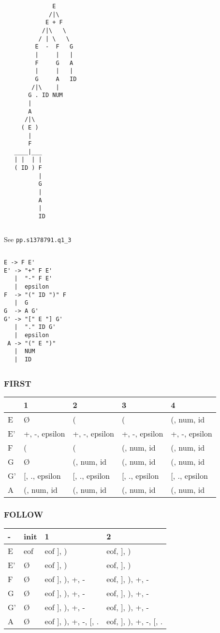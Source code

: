 \begin{verbatim}
              E
             /|\
            E + F
           /|\   \
          / | \   \
         E  -  F   G
         |     |   |
         F     G   A
         |     |   |
         G     A   ID
        /|\    |
       G . ID NUM
       |
       A
      /|\
     ( E )
       |
       F
   ____|___
   | |  | |
   ( ID ) F
          |
          G
          |
          A
          |
          ID
\end{verbatim}

\subsection{}
See \texttt{pp.s1378791.q1\_3}

\subsection{}
\begin{verbatim}
E -> F E'
E' -> "+" F E'
   |  "-" F E'
   |  epsilon
F  -> "(" ID ")" F
   |  G
G  -> A G'
G' -> "[" E "] G'
   |  "." ID G'
   |  epsilon
 A -> "(" E ")"
   |  NUM
   |  ID
\end{verbatim}

\subsection{}
\subsubsection{FIRST}
\begin{tabular}{lllll}
& 1 & 2 & 3 & 4 \\
\hline
E & Ø & ( & ( & (, num, id \\
E'& +, -, epsilon & +, -, epsilon & +, -, epsilon & +, -, epsilon \\
F & ( & ( & (, num, id & (, num, id \\
G & Ø & (, num, id & (, num, id &  (, num, id \\
G'& [, ., epsilon & [, ., epsilon & [, ., epsilon & [, ., epsilon \\
A & (, num, id & (, num, id & (, num, id & (, num, id \\
\end{tabular}

\subsubsection{FOLLOW}
\begin{tabular}{llll}
- & init & 1 & 2 \\
\hline
E & eof & eof ], ) & eof, ], ) \\
E'& Ø & eof ], ) & eof, ], ) \\
F & Ø & eof ], ), +, - &  eof, ], ), +, - \\
G & Ø & eof ], ), +, - &  eof, ], ), +, - \\
G'& Ø & eof ], ), +, - &  eof, ], ), +, - \\
A & Ø & eof ], ), +, -, [, .  &  eof, ], ), +, -, [, . \\
\end{tabular}

